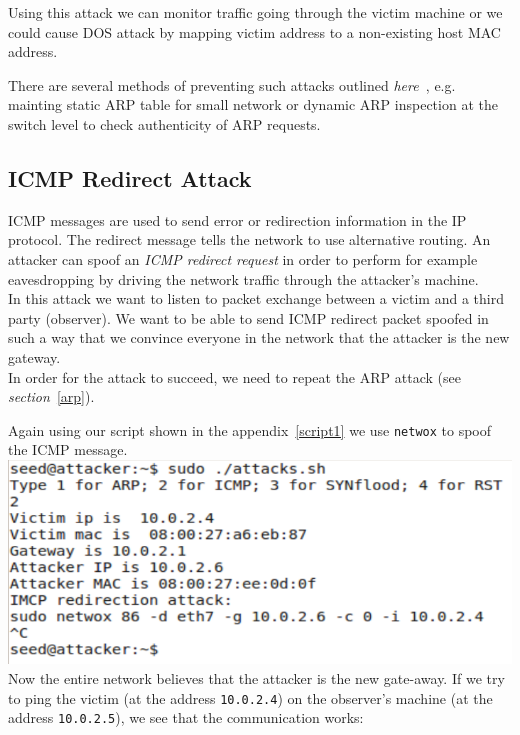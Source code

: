 \documentclass[12pt, a4paper]{article}
\begin{document}
Using this attack we can monitor traffic going through the victim machine or we could cause DOS attack by mapping victim address to a non-existing host MAC address.

There are several methods of preventing such attacks outlined \textit{here~\cite{blog}}, e.g. mainting static ARP table for small network or dynamic ARP inspection at the switch level to check authenticity of ARP requests.


\subsection{ICMP Redirect Attack}

ICMP messages are used to send error or redirection information in the IP protocol. The redirect message tells the network to use alternative routing. An attacker can spoof an \emph{ICMP redirect request} in order to perform for example eavesdropping by driving the network traffic through the attacker's machine.\\

In this attack we want to listen to packet exchange between a victim and a third party (observer). We want to be able to send ICMP redirect packet spoofed in such a way that we convince everyone in the network that the attacker is the new gateway.\\

In order for the attack to succeed, we need to repeat the ARP attack (see \emph{section}~\ref{arp}).

Again using our script shown in the appendix~\ref{script1} we use \texttt{netwox} to spoof the ICMP message.\\
\includegraphics[width=.95\textwidth]{gfx/imcp-netwox}\\


Now the entire network believes that the attacker is the new gate-away. If we try to ping the victim (at the address \texttt{10.0.2.4}) on the observer's machine (at the address \texttt{10.0.2.5}), we see that the communication works:\\
\end{document}
